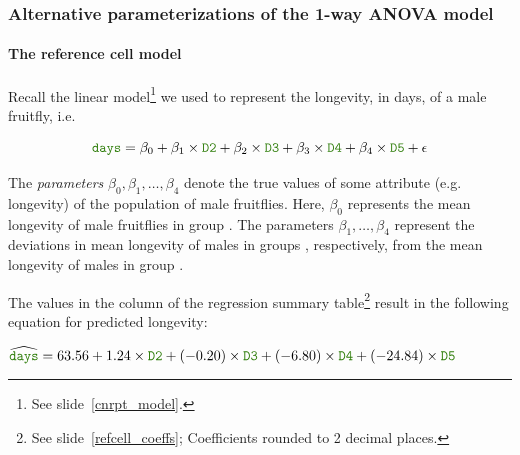 \documentclass{beamer}\usepackage[]{graphicx}\usepackage[]{xcolor}
\begin{document}


\begin{frame}[fragile]
\frametitle{Alternative parameterizations of the 1-way ANOVA model}
\framesubtitle{The reference cell model}
  
Recall the linear model\footnote{See slide~\ref{cnrpt_model}.} we used to represent the longevity, in days, of a male fruitfly, i.e.
  
\vspace{-2mm}
  
\[\rcode{days}=\beta_0+\beta_{1}\times\rcode{D2} +\beta_{2}\times\rcode{D3} + \beta_{3}\times\rcode{D4}+  \beta_{4}\times\rcode{D5} + \epsilon\]
  
\vspace{-5mm}
  
The {\em parameters} $\beta_0,\beta_1,\ldots,\beta_4$ denote the true values of some attribute (e.g. longevity) of the population of male fruitflies. Here, $\beta_0$ represents the mean longevity of male fruitflies in group . The parameters $\beta_1,\ldots,\beta_4$ represent the deviations in mean longevity of males in groups , respectively, from the mean longevity of males in group . 
  
\medskip
  
The values in the  column of the regression summary table\footnote{See slide~\ref{refcell_coeffs}; Coefficients rounded to 2 decimal places.} result in the following equation for predicted longevity:
    

    
\medskip
  
\begin{center}
\small
$ \widehat{\rcode{days}}=63.56+1.24\times \rcode{D2} + (-0.20)\times \rcode{D3} + (-6.80)\times \rcode{D4} + (-24.84)\times \rcode{D5}$
\end{center}
  
\end{frame}
  
\end{document}
